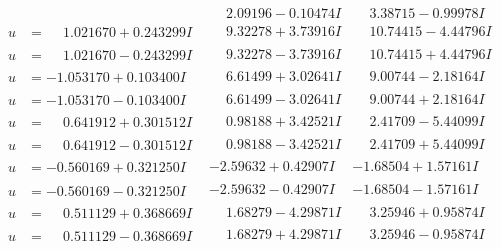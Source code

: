 \documentclass[1p]{elsarticle_modified}
\theoremstyle{definition}
\begin{document}
$$\begin{array}{c|c|c}
 & \phantom{-}2.09196 - 0.10474 I & \phantom{-}3.38715 - 0.99978 I \\ \hline\begin{aligned}
u &= \phantom{-}1.021670 + 0.243299 I\end{aligned}
 & \phantom{-}9.32278 + 3.73916 I & \phantom{-}10.74415 - 4.44796 I \\ \hline\begin{aligned}
u &= \phantom{-}1.021670 - 0.243299 I\end{aligned}
 & \phantom{-}9.32278 - 3.73916 I & \phantom{-}10.74415 + 4.44796 I \\ \hline\begin{aligned}
u &= -1.053170 + 0.103400 I\end{aligned}
 & \phantom{-}6.61499 + 3.02641 I & \phantom{-}9.00744 - 2.18164 I \\ \hline\begin{aligned}
u &= -1.053170 - 0.103400 I\end{aligned}
 & \phantom{-}6.61499 - 3.02641 I & \phantom{-}9.00744 + 2.18164 I \\ \hline\begin{aligned}
u &= \phantom{-}0.641912 + 0.301512 I\end{aligned}
 & \phantom{-}0.98188 + 3.42521 I & \phantom{-}2.41709 - 5.44099 I \\ \hline\begin{aligned}
u &= \phantom{-}0.641912 - 0.301512 I\end{aligned}
 & \phantom{-}0.98188 - 3.42521 I & \phantom{-}2.41709 + 5.44099 I \\ \hline\begin{aligned}
u &= -0.560169 + 0.321250 I\end{aligned}
 & -2.59632 + 0.42907 I & -1.68504 + 1.57161 I \\ \hline\begin{aligned}
u &= -0.560169 - 0.321250 I\end{aligned}
 & -2.59632 - 0.42907 I & -1.68504 - 1.57161 I \\ \hline\begin{aligned}
u &= \phantom{-}0.511129 + 0.368669 I\end{aligned}
 & \phantom{-}1.68279 - 4.29871 I & \phantom{-}3.25946 + 0.95874 I \\ \hline\begin{aligned}
u &= \phantom{-}0.511129 - 0.368669 I\end{aligned}
 & \phantom{-}1.68279 + 4.29871 I & \phantom{-}3.25946 - 0.95874 I \\ \hline\begin{aligned}

\end{aligned}
\end{array}$$
\end{document}
